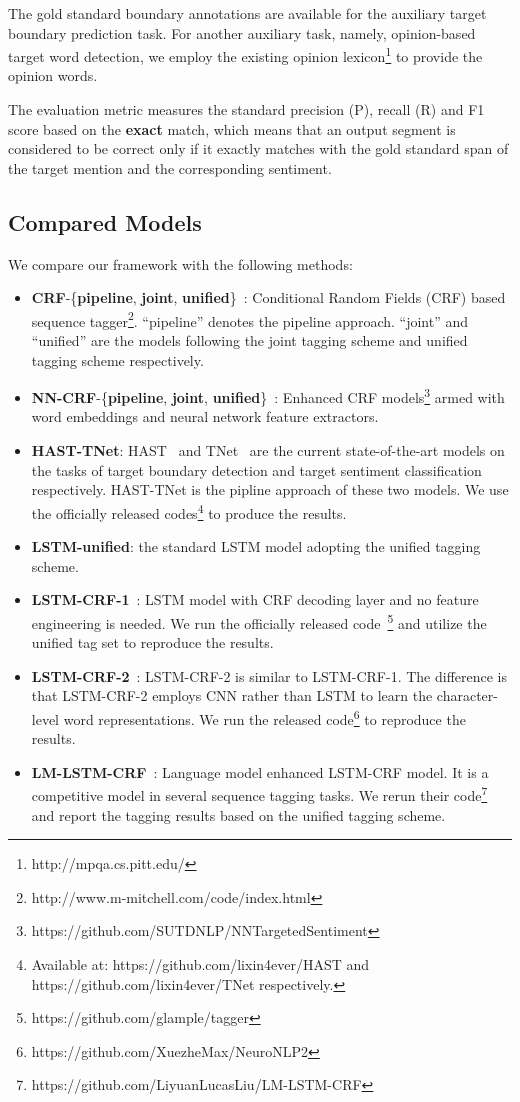 \documentclass[letterpaper]{article} %
\begin{document}
The gold standard boundary annotations are available for the auxiliary target boundary prediction task. For another auxiliary task, namely, opinion-based target word detection, we employ the existing opinion lexicon\footnote{http://mpqa.cs.pitt.edu/} to provide the opinion words. 

The evaluation metric measures the standard precision (P), recall (R) and F1 score based on the \textbf{exact} match, which means that an output segment is considered to be correct only if it exactly matches with the gold standard span of the target mention and the corresponding sentiment. 

\subsection{Compared Models}
We compare our framework with the following methods:
\begin{itemize}
    \item \textbf{CRF}-\{\textbf{pipeline}, \textbf{joint}, \textbf{unified}\}~\cite{D13-1171}: Conditional Random Fields (CRF) based sequence tagger\footnote{http://www.m-mitchell.com/code/index.html}. ``pipeline'' denotes the pipeline approach. ``joint'' and ``unified'' are the models following the joint tagging scheme and unified tagging scheme respectively.
    \item \textbf{NN-CRF}-\{\textbf{pipeline}, \textbf{joint}, \textbf{unified}\}~\cite{D15-1073}: Enhanced CRF models\footnote{https://github.com/SUTDNLP/NNTargetedSentiment} armed with word embeddings and neural network feature extractors.
    \item \textbf{HAST-TNet}: HAST~\cite{li2018aspect} and TNet~\cite{P18-1087} are the current state-of-the-art models on the tasks of target boundary detection and target sentiment classification respectively. HAST-TNet is the pipline approach of these two models. We use the officially released codes\footnote{Available at: https://github.com/lixin4ever/HAST and  https://github.com/lixin4ever/TNet respectively.} to produce the results.
    \item \textbf{LSTM-unified}: the standard LSTM model adopting the unified tagging scheme.
    \item \textbf{LSTM-CRF-1}~\cite{N16-1030}: LSTM model with CRF decoding layer and no feature engineering is needed. We run the officially released code~\footnote{https://github.com/glample/tagger} and utilize the unified tag set to reproduce the results. 
    \item \textbf{LSTM-CRF-2}~\cite{P16-1101}: LSTM-CRF-2 is similar to LSTM-CRF-1. The difference is that LSTM-CRF-2 employs CNN rather than LSTM to learn the character-level word representations. We run the released code\footnote{https://github.com/XuezheMax/NeuroNLP2} to reproduce the results.
    \item \textbf{LM-LSTM-CRF}~\cite{liu2017empower}: Language model enhanced LSTM-CRF model. It is a competitive model in several sequence tagging tasks. We rerun their code\footnote{https://github.com/LiyuanLucasLiu/LM-LSTM-CRF} and report the tagging results based on the unified tagging scheme.
\end{itemize}
\end{document}
